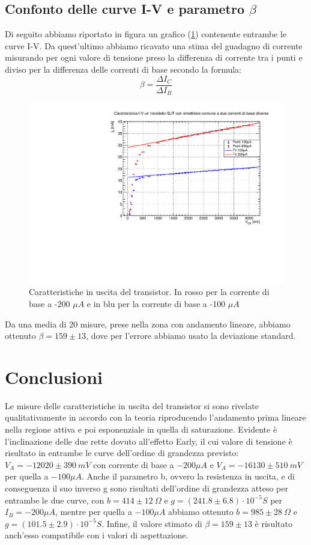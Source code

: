 \documentclass[]{article}
\begin{document}
\subsection{Confonto delle curve I-V e parametro $ \beta $}
Di seguito abbiamo riportato in figura un grafico (\ref{fig:multigrafo}) contenente entrambe le curve I-V. Da quest'ultimo abbiamo ricavato una stima del guadagno di corrente misurando per ogni valore di tensione preso la differenza di corrente tra i punti e diviso per la differenza delle correnti di base secondo la formula:
\begin{equation}
	\beta=\frac{\Delta I_{C}}{\Delta I_{B}}
\end{equation}
	\begin{figure}[H]
		\centering
		\includegraphics[width=0.9\linewidth]{../c1}
		\caption{Caratteristiche in uscita del transistor. In rosso per la corrente di base a -200 $ \mu A $ e in blu per la corrente di base a -100 $ \mu A $}
		\label{fig:multigrafo}
	\end{figure}
Da una media di 20 misure, prese nella zona con andamento lineare, abbiamo ottenuto $ \beta =159\pm 13 $, dove per l'errore abbiamo usato la deviazione standard.
\section*{Conclusioni}
Le misure delle caratteristiche in uscita del transistor si sono rivelate qualitativamente in accordo con la teoria riproducendo l'andamento prima lineare nella regione attiva e poi esponenziale in quella di saturazione. Evidente è l'inclinazione delle due rette dovuto all'effetto Early, il cui valore di tensione è risultato in entrambe le curve dell'ordine di grandezza previsto: $ V_{A}=-12020\pm390\ mV $ con corrente di base a $ -200 \mu A $ e $ V_{A}=-16130\pm510\ mV $ per quella a $ -100 \mu A $.  
Anche il parametro b, ovvero la resistenza in uscita, e di conseguenza il suo inverso g sono risultati dell'ordine di grandezza atteso per entrambe le due curve, con $ b=414\pm12\ \Omega $ e $ g=(241.8\pm6.8)\cdot 10^{-5} S $ per $ I_{B}= -200 \mu A $, mentre per quella a $ -100 \mu A $ abbiamo ottenuto $ b= 985\pm28\ \Omega$ e $ g=(101.5\pm2.9)\cdot 10^{-5} S  $. 
Infine, il valore stimato di $ \beta= 159\pm 13$ è risultato anch'esso compatibile con i valori di aspettazione.
\end{document}
